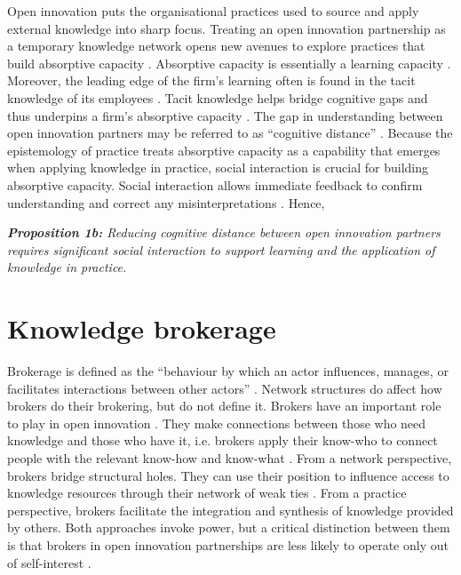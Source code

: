 Open innovation puts the organisational practices used to source and apply external knowledge into sharp focus. Treating an open innovation partnership as a temporary knowledge network opens new avenues to explore practices that build absorptive capacity \citep{vanhaverbeke2007connecting,xia2016unpacking}. Absorptive capacity is essentially a learning capacity \citep{cohen1989innovation, cohen1990absorptive, nooteboom2000learning, lichtenthaler2009absorptive}. Moreover, the leading edge of the firm's learning often is found in the tacit knowledge of its employees \citep{horvath2000working}. Tacit knowledge helps bridge cognitive gaps and thus underpins a firm's absorptive capacity \citep{thomas2021tacit}. The gap in understanding between open innovation partners may be referred to as \enquote{cognitive distance} \citep{nooteboom2000learning,nooteboom2007optimal}. Because the epistemology of practice treats absorptive capacity as a capability that emerges when applying knowledge in practice, social interaction is crucial for building absorptive capacity. Social interaction allows immediate feedback to confirm understanding and correct any misinterpretations \citep{haldin2000difficulties,gertler2003tacit,koskinen2003tacit}. Hence, \bigskip

\begin{tcolorbox}
\textit{\textbf{Proposition 1b:} Reducing cognitive distance between open innovation partners requires significant social interaction to support learning and the application of knowledge in practice.}
\end{tcolorbox}

\section{Knowledge brokerage}

Brokerage is defined as the \enquote{behaviour by which an actor influences, manages, or facilitates interactions between other actors} \citep[][pg. 141]{obstfeld2014brokerage}. Network structures do affect how brokers do their brokering, but do not define it. Brokers have an important role to play in open innovation \citep{whelan2011creating,cococcioni2014exploring}. They make connections between those who need knowledge and those who have it, i.e. brokers apply their know-who to connect people with the relevant know-how and know-what \citep{davenport1998working}. From a network perspective, brokers bridge structural holes. They can use their position to influence access to knowledge resources through their network of weak ties \citep{burt1992structural,hanneman2005introduction,davis2010agency,simpson2011network,stovel2012brokerage}. From a practice perspective, brokers facilitate the integration and synthesis of knowledge provided by others. Both approaches invoke power, but a critical distinction between them is that brokers in open innovation partnerships are less likely to operate only out of self-interest \citep{lingo2010nexus,marabelli2016strategic}. \medskip

